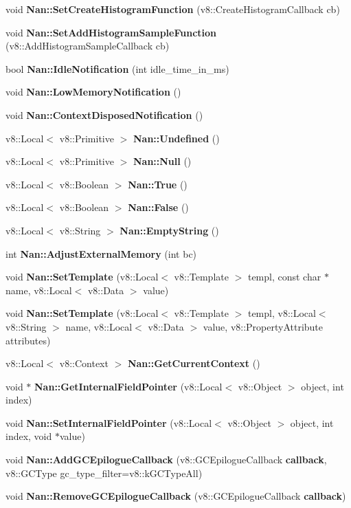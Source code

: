 \begin{DoxyCompactItemize}
\item 
void \textbf{ Nan\+::\+Set\+Create\+Histogram\+Function} (v8\+::\+Create\+Histogram\+Callback cb)
\item 
void \textbf{ Nan\+::\+Set\+Add\+Histogram\+Sample\+Function} (v8\+::\+Add\+Histogram\+Sample\+Callback cb)
\item 
bool \textbf{ Nan\+::\+Idle\+Notification} (int idle\+\_\+time\+\_\+in\+\_\+ms)
\item 
void \textbf{ Nan\+::\+Low\+Memory\+Notification} ()
\item 
void \textbf{ Nan\+::\+Context\+Disposed\+Notification} ()
\item 
v8\+::\+Local$<$ v8\+::\+Primitive $>$ \textbf{ Nan\+::\+Undefined} ()
\item 
v8\+::\+Local$<$ v8\+::\+Primitive $>$ \textbf{ Nan\+::\+Null} ()
\item 
v8\+::\+Local$<$ v8\+::\+Boolean $>$ \textbf{ Nan\+::\+True} ()
\item 
v8\+::\+Local$<$ v8\+::\+Boolean $>$ \textbf{ Nan\+::\+False} ()
\item 
v8\+::\+Local$<$ v8\+::\+String $>$ \textbf{ Nan\+::\+Empty\+String} ()
\item 
int \textbf{ Nan\+::\+Adjust\+External\+Memory} (int bc)
\item 
void \textbf{ Nan\+::\+Set\+Template} (v8\+::\+Local$<$ v8\+::\+Template $>$ templ, const char $\ast$name, v8\+::\+Local$<$ v8\+::\+Data $>$ value)
\item 
void \textbf{ Nan\+::\+Set\+Template} (v8\+::\+Local$<$ v8\+::\+Template $>$ templ, v8\+::\+Local$<$ v8\+::\+String $>$ name, v8\+::\+Local$<$ v8\+::\+Data $>$ value, v8\+::\+Property\+Attribute attributes)
\item 
v8\+::\+Local$<$ v8\+::\+Context $>$ \textbf{ Nan\+::\+Get\+Current\+Context} ()
\item 
void $\ast$ \textbf{ Nan\+::\+Get\+Internal\+Field\+Pointer} (v8\+::\+Local$<$ v8\+::\+Object $>$ object, int index)
\item 
void \textbf{ Nan\+::\+Set\+Internal\+Field\+Pointer} (v8\+::\+Local$<$ v8\+::\+Object $>$ object, int index, void $\ast$value)
\item 
void \textbf{ Nan\+::\+Add\+G\+C\+Epilogue\+Callback} (v8\+::\+G\+C\+Epilogue\+Callback \textbf{ callback}, v8\+::\+G\+C\+Type gc\+\_\+type\+\_\+filter=v8\+::k\+G\+C\+Type\+All)
\item 
void \textbf{ Nan\+::\+Remove\+G\+C\+Epilogue\+Callback} (v8\+::\+G\+C\+Epilogue\+Callback \textbf{ callback})

\end{DoxyCompactItemize}
